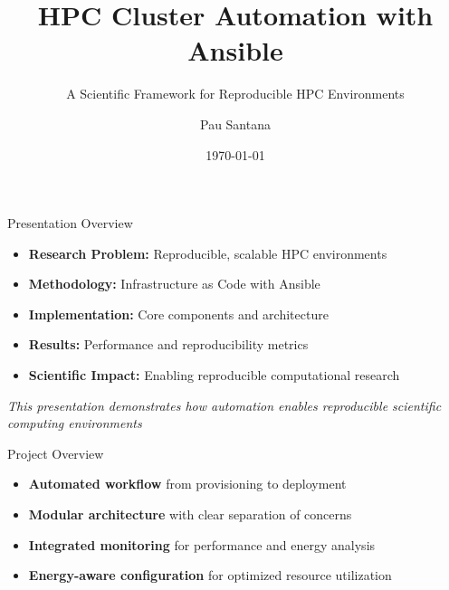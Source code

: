 \documentclass[aspectratio=169]{beamer}
\title[HPC Cluster Automation]{HPC Cluster Automation with Ansible}
\subtitle{A Scientific Framework for Reproducible HPC Environments}
\author{Pau Santana}
\institute{Research Computing}
\date{\today}
\begin{document}
\begin{frame}
  \titlepage
\end{frame}

\begin{frame}{Presentation Overview}
  \begin{itemize}
    \item \textbf{Research Problem:} Reproducible, scalable HPC environments
    \item \textbf{Methodology:} Infrastructure as Code with Ansible
    \item \textbf{Implementation:} Core components and architecture
    \item \textbf{Results:} Performance and reproducibility metrics
    \item \textbf{Scientific Impact:} Enabling reproducible computational research
  \end{itemize}
  
  \vspace{0.3cm}
  \begin{center}
    \textit{This presentation demonstrates how automation enables reproducible scientific computing environments}
  \end{center}
\end{frame}

\begin{frame}{Project Overview}
  \begin{center}
  \end{center}
  
  \vspace{0.3cm}
  \begin{itemize}
    \item \textbf{Automated workflow} from provisioning to deployment
    \item \textbf{Modular architecture} with clear separation of concerns
    \item \textbf{Integrated monitoring} for performance and energy analysis
    \item \textbf{Energy-aware configuration} for optimized resource utilization
  \end{itemize}
\end{frame}
\end{document}

